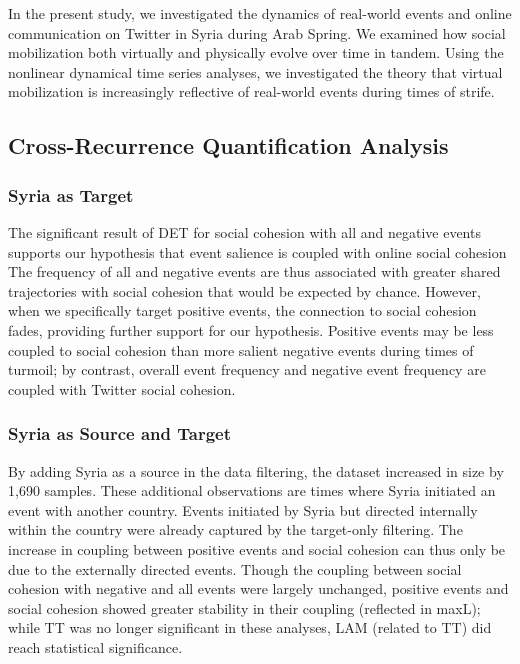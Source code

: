 \documentclass[english,man]{apa6}
\begin{document}
In the present study, we investigated the dynamics of real-world events
and online communication on Twitter in Syria during Arab Spring. We examined
how social mobilization both virtually and physically evolve over time in
tandem. Using the
nonlinear dynamical time series analyses, we investigated the theory that
virtual mobilization is increasingly reflective of real-world events
during times of strife.

\hypertarget{cross-recurrence-quantification-analysis-2}{%
\subsection{Cross-Recurrence Quantification Analysis}\label{cross-recurrence-quantification-analysis-2}}

\hypertarget{syria-as-target-2}{%
\subsubsection{Syria as Target}\label{syria-as-target-2}}

The significant result of DET for social cohesion with all and negative
events supports our hypothesis that
event salience is coupled with online social cohesion The frequency
of all and negative events are thus associated with greater
shared trajectories with social cohesion that would be expected by chance.
However, when we specifically target positive events, the connection
to social cohesion fades, providing further
support for our hypothesis. Positive events
may be less coupled to social cohesion than more salient negative events
during times of turmoil; by contrast, overall event frequency and
negative event frequency are coupled with Twitter social cohesion.

\hypertarget{syria-as-source-and-target-2}{%
\subsubsection{Syria as Source and Target}\label{syria-as-source-and-target-2}}

By adding Syria as a source in the data filtering, the dataset increased
in size by 1,690 samples. These additional observations are times where
Syria initiated an event with another country. Events initiated by Syria
but directed internally within the country were already captured by the
target-only filtering. The increase in coupling between positive events
and social cohesion can thus only be due to the externally
directed events. Though the coupling between social cohesion with
negative and all events were largely unchanged,
positive events and social cohesion showed greater stability
in their coupling (reflected in maxL); while TT was no longer
significant in these analyses, LAM (related to TT) did
reach statistical significance.
\end{document}
